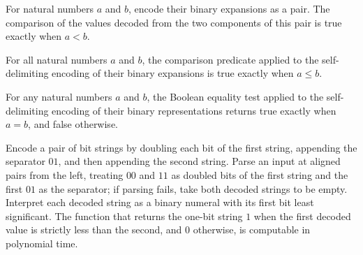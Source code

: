 \begin{theorem}
\label{Complexity.BinArith.lt_pairEncode}
\leanok
{}
For natural numbers $a$ and $b$, encode their binary expansions as a pair. The
comparison of the values decoded from the two components of this pair is true exactly
when $a<b$.
\end{theorem}

\begin{theorem}
\label{Complexity.BinArith.le_pairEncode}
\leanok
{}
For all natural numbers $a$ and $b$, the comparison predicate applied to the
self-delimiting encoding of their binary expansions is true exactly when $a \le b$.
\end{theorem}

\begin{theorem}
\label{Complexity.BinArith.beq_pairEncode}
\leanok
{}
For any natural numbers $a$ and $b$, the Boolean equality test applied to the
self-delimiting encoding of their binary representations returns true exactly when
$a=b$, and false otherwise.
\end{theorem}

\begin{theorem}
\label{Complexity.BinArith.polyTimeComputable_lt}
\leanok
{}
Encode a pair of bit strings by doubling each bit of the first string, appending the
separator $01$, and then appending the second string. Parse an input at aligned pairs
from the left, treating $00$ and $11$ as doubled bits of the first string and the first
$01$ as the separator; if parsing fails, take both decoded strings to be empty.
Interpret each decoded string as a binary numeral with its first bit least significant.
The function that returns the one-bit string $1$ when the first decoded value is
strictly less than the second, and $0$ otherwise, is computable in polynomial time.
\end{theorem}

